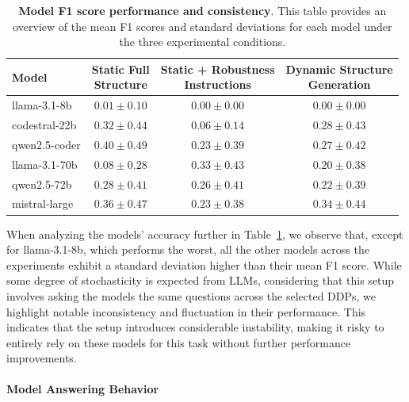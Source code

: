 \documentclass{DESSThesis}
\begin{document}
\begin{table}[!b]
    \centering
    \renewcommand{\arraystretch}{1.2}
    \setlength{\tabcolsep}{10pt}
    \begin{tabular}{lccc}
        \hline
        \textbf{Model} & 
        \makecell{\textbf{Static Full} \\ \textbf{Structure}} & 
        \makecell{\textbf{Static + Robustness} \\ \textbf{Instructions}} & 
        \makecell{\textbf{Dynamic Structure} \\ \textbf{Generation}} \\
        \hline
        llama-3.1-8b   & \cellcolor{red!15} $0.01 \pm 0.10$ & \cellcolor{red!15} $0.00 \pm 0.00$ & \cellcolor{red!15} $0.00 \pm 0.00$ \\
        codestral-22b   & $0.32 \pm 0.44$ & $0.06 \pm 0.14$ & $0.28 \pm 0.43$ \\
        qwen2.5-coder   & $0.40 \pm 0.49$ & $0.23 \pm 0.39$ & $0.27 \pm 0.42$ \\
        llama-3.1-70b   & $0.08 \pm 0.28$ & $0.33 \pm 0.43$ & $0.20 \pm 0.38$ \\
        qwen2.5-72b     & $0.28 \pm 0.41$ & $0.26 \pm 0.41$ & $0.22 \pm 0.39$ \\
        mistral-large   & $0.36 \pm 0.47$ & $0.23 \pm 0.38$ & $0.34 \pm 0.44$ \\
        \hline
    \end{tabular}
    \caption[Model F1 score performance and consistency]{\textbf{Model F1 score performance and consistency}. This table provides an overview of the mean F1 scores and standard deviations for each model under the three experimental conditions.}
    \label{tab:F1_and_st_deviation}
\end{table}

When analyzing the models' accuracy further in Table~\ref{tab:F1_and_st_deviation}, we observe that, except for llama-3.1-8b, which performs the worst, all the other models across the experiments exhibit a standard deviation higher than their mean F1 score. While some degree of stochasticity is expected from LLMs, considering that this setup involves asking the models the same questions across the selected DDPs, we highlight notable inconsistency and fluctuation in their performance. This indicates that the setup introduces considerable instability, making it risky to entirely rely on these models for this task without further performance improvements.

\paragraph{Model Answering Behavior}\mbox{}\\
\end{document}
